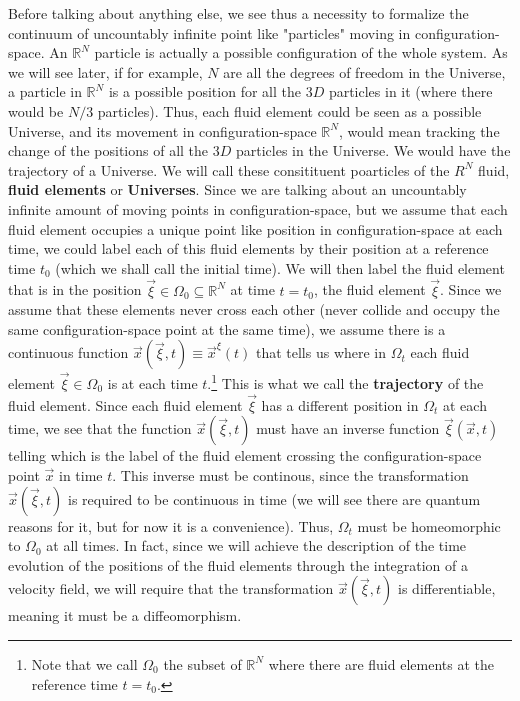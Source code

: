 \documentclass[11pt, a4paper]{article} %
\newcommand{\R}{\mathbb{R}} %
\begin{document}
Before talking about anything else, we see thus a necessity to formalize the continuum of uncountably infinite point like "particles" moving in configuration-space. An $\R^N$ particle is actually a possible configuration of the whole system. As we will see later, if for example, $N$ are all the degrees of freedom in the Universe, a particle in $\R^N$ is a possible position for all the $3D$ particles in it (where there would be $N/3$ particles). Thus, each fluid element could be seen as a possible Universe, and its movement in configuration-space $\R^N$, would mean tracking the change of the positions of all the $3D$ particles in the Universe. We would have the trajectory of a Universe. We will call these consitituent poarticles of the $R^N$ fluid, {\bf fluid elements} or {\bf Universes}. Since we are talking about an uncountably infinite amount of moving points in configuration-space, but we assume that each fluid element occupies a unique point like position in configuration-space at each time, we could label each of this fluid elements by their position at a reference time $t_0$ (which we shall call the initial time). We will then label the fluid element that is in the position $\vec{\xi}\in\Omega_0\subseteq \R^N$ at time $t=t_0$, the fluid element $\vec{\xi}$. Since we assume that these elements never cross each other (never collide and occupy the same configuration-space point at the same time), we assume there is a continuous function $\vec{x}(\vec{\xi},t)\equiv \vec{x}^\xi(t)$ that tells us where in $\Omega_t$ each fluid element $\vec{\xi}\in\Omega_0$ is at each time $t$.\footnote{Note that we call $\Omega_0$ the subset of $\R^N$ where there are fluid elements at the reference time $t=t_0$. } This is what we call the {\bf trajectory} of the fluid element. Since each fluid element $\vec{\xi}$ has a different position in $\Omega_t$ at each time, we see that the function $\vec{x}(\vec{\xi},t)$ must have an inverse function $\vec{\xi}(\vec{x},t)$ telling which is the label of the fluid element crossing the configuration-space point $\vec{x}$ in time $t$. This inverse must be continous, since the transformation $\vec{x}(\vec{\xi},t)$ is required to be continuous in time (we will see there are quantum reasons for it, but for now it is a convenience). Thus, $\Omega_t$ must be homeomorphic to $\Omega_0$ at all times. In fact, since we will achieve the description of the time evolution of the positions of the fluid elements through the integration of a velocity field, we will require that the transformation $\vec{x}(\vec{\xi},t)$ is differentiable, meaning it must be a diffeomorphism.
\end{document}
